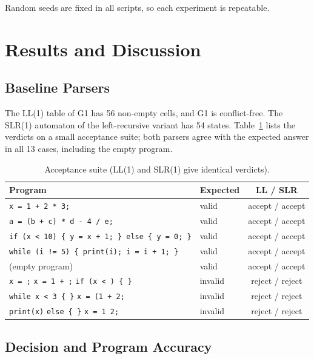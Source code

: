 \documentclass[12pt,a4paper]{article}
\newcommand{\tok}[1]{\texttt{#1}}
\begin{document}
Random seeds are fixed in all scripts, so each experiment is repeatable.

\newpage
\section{Results and Discussion}

\subsection{Baseline Parsers}

The LL(1) table of G1 has 56 non-empty cells, and G1 is conflict-free. The SLR(1)
automaton of the left-recursive variant has 54 states. Table~\ref{tab:accept}
lists the verdicts on a small acceptance suite; both parsers agree with the
expected answer in all 13 cases, including the empty program.

\begin{table}[H]
\centering
\caption{Acceptance suite (LL(1) and SLR(1) give identical verdicts).}
\label{tab:accept}
\small
\begin{tabular}{llc}
\toprule
\textbf{Program} & \textbf{Expected} & \textbf{LL / SLR}\\
\midrule
\tok{x = 1 + 2 * 3;} & valid & accept / accept\\
\tok{a = (b + c) * d - 4 / e;} & valid & accept / accept\\
\tok{if (x < 10) \{ y = x + 1; \} else \{ y = 0; \}} & valid & accept / accept\\
\tok{while (i != 5) \{ print(i); i = i + 1; \}} & valid & accept / accept\\
(empty program) & valid & accept / accept\\
\tok{x = ;} \quad \tok{x = 1 + ;} \quad \tok{if (x < ) \{ \}} & invalid & reject / reject\\
\tok{while x < 3 \{ \}} \quad \tok{x = (1 + 2;} & invalid & reject / reject\\
\tok{print(x)} \quad \tok{else \{ \}} \quad \tok{x = 1 2;} & invalid & reject / reject\\
\bottomrule
\end{tabular}
\end{table}

\subsection{Decision and Program Accuracy}
\end{document}
